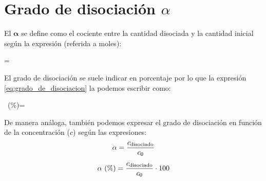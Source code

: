 \section{Grado de disociación \texorpdfstring{\( \alpha \)}{alfa}}\label{sec:grado-de-disociacion}
\setcounter{ejemplo}{0}

\begin{center}
    \begin{definition}
        El  \(\bm{\alpha}\) se define como el cociente entre la cantidad disociada y la cantidad inicial según la expresión (referida a moles):
        \begin{centeredequation}
            \alpha =  \label{eq:grado_de_disociacion}
        \end{centeredequation}
    \end{definition}
\end{center}

El grado de disociación se suele indicar en porcentaje por lo que la expresión \eqref{eq:grado_de_disociacion} la podemos escribir como:
\begin{centeredequation}
    \alpha\ (\%)=  \label{eq:grado_de_disociacion_porcentaje}
\end{centeredequation}

De manera análoga, también podemos expresar el grado de disociación en función de la concentración (\(c\)) según las expresiones:
\begin{gather}
    \alpha= \dfrac{c_{\text{disociado}}}{c_0} \label{eq:grado_de_disociacion_concentracion}\separ
    \alpha\ (\%) = \dfrac{c_{\text{disociado}}}{c_0}\cdot 100 \label{eq:grado_de_disociacion__concentracion_porcentaje}
\end{gather}

